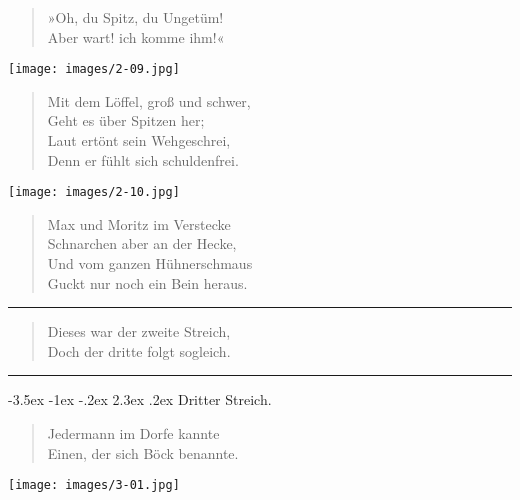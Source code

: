\documentclass[a4paper,12pt]{article}
\makeatletter
\renewcommand\section{\@startsection {section}{1}{\z@}%
                                   {-3.5ex \@plus -1ex \@minus -.2ex}%
                                   {2.3ex \@plus.2ex}%
                                   {\centering\normalfont\LARGE\bfseries}}
\makeatother
\begin{document}
\begin{verse}
»Oh, du Spitz, du Ungetüm!\\{}
Aber wart! ich komme ihm!«
\end{verse}



\begin{center}\texttt{[image: images/2-09.jpg]}\end{center}



\begin{verse}
Mit dem Löffel, groß und schwer,\\{}
Geht es über Spitzen her;\\{}
Laut ertönt sein Wehgeschrei,\\{}
Denn er fühlt sich schuldenfrei.
\end{verse}



\begin{center}\texttt{[image: images/2-10.jpg]}\end{center}



\begin{verse}
Max und Moritz im Verstecke\\{}
Schnarchen aber an der Hecke,\\{}
Und vom ganzen Hühnerschmaus\\{}
Guckt nur noch ein Bein heraus.
\end{verse}


\hrule


\begin{verse}
Dieses war der zweite Streich,\\{}
Doch der dritte folgt sogleich.
\end{verse}


\hrule


\clearpage
\section{Dritter Streich.\label{Dritter_Streich}}


\begin{verse}
Jedermann im Dorfe kannte\\{}
Einen, der sich Böck benannte.
\end{verse}



\begin{center}\texttt{[image: images/3-01.jpg]}\end{center}
\end{document}
